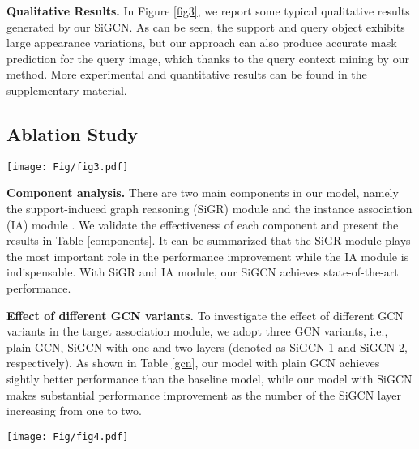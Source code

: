 \documentclass{bmvc2k}
\begin{document}
\textbf{Qualitative Results.} In Figure \ref{fig3}, we report some typical qualitative results generated by our SiGCN. As can be seen, the support and query object exhibits large appearance variations, but our  approach can also produce accurate mask prediction for the query image, which thanks to the query context mining by our method. More experimental and quantitative results can be found in the supplementary material.\vspace{2mm}


\subsection{Ablation Study}
\begin{figure*}[!t]
	\centering
	\texttt{[image: Fig/fig3.pdf]}
	\caption{Qualitative results on the PASCAL- (left four columns) and COCO- (right four columns) under the 1-shot setting. Our SiGCN can make accurate segmentation prediction, even though the support and query objects exhibit larger appearance variations.\vspace{-4mm}}
	\label{fig3}
\end{figure*}

\textbf{Component analysis.}
There are two main components in our model, namely the support-induced graph reasoning (SiGR) module  and the instance association (IA) module . We validate the effectiveness of each component and present the results in Table  \ref{components}. It can be summarized that the SiGR module plays the most important role in the performance improvement while the IA module is indispensable. With SiGR and IA module, our SiGCN achieves state-of-the-art performance.

\textbf{Effect of different GCN variants.} To investigate the effect of different GCN variants in the target association module, we adopt three GCN variants, i.e., plain GCN, SiGCN with one and two layers (denoted as SiGCN-1 and SiGCN-2, respectively). As shown in Table \ref{gcn}, our model with plain GCN achieves sightly better performance than the baseline model, while our model with SiGCN makes substantial performance improvement as  the number of the SiGCN layer increasing from one to two.
\begin{figure*}[!t]
	\centering
	\texttt{[image: Fig/fig4.pdf]}\vspace{-2mm}
	\caption{Ablation studies of (a) support instance size  and (b) mask threshold  on PASCAL- under the 1-shot setting.}\vspace{-4mm}
	\label{fig4}
\end{figure*}
\end{document}
